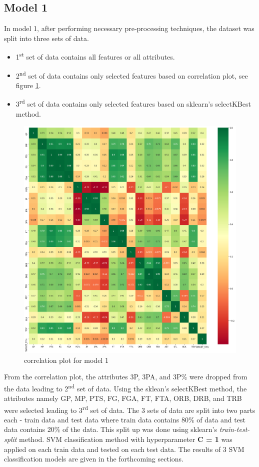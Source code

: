 \documentclass[format=sigconf]{acmart}
\begin{document}
\subsection{Model 1}
In model 1, after performing necessary pre-processing techniques, the dataset was split into three sets of data.
\begin{itemize}
    \item 1\textsuperscript{st} set of data contains all features or all attributes.
    \item 2\textsuperscript{nd} set of data contains only selected features based on correlation plot, see figure \ref{fig:corplot1}.
    \item 3\textsuperscript{rd} set of data contains only selected features based on sklearn's selectKBest method.
\end{itemize}
\begin{figure}[H]
    \centering
    \includegraphics[scale=0.20]{images/correlation_plot_1.png}
    \caption{correlation plot for model 1}
    \label{fig:corplot1}
\end{figure}

From the correlation plot, the attributes 3P, 3PA, and 3P\% were dropped from the data leading to 2\textsuperscript{nd} set of data. 
Using the sklean's selectKBest method, the attributes namely GP, MP, PTS, FG, FGA, FT, FTA, ORB, DRB, and TRB were selected leading
to 3\textsuperscript{rd} set of data.
The 3 sets of data are split into two parts each - train data and test data where train data contains 80\% of data and test data contains
20\% of the data. This split up was done using sklearn's \textit{train-test-split} method. SVM classification method 
with hyperparameter \textbf{C = 1} was applied on each train data and tested on each test data. The results of 3 SVM classification 
models are given in the forthcoming sections.
\end{document}
